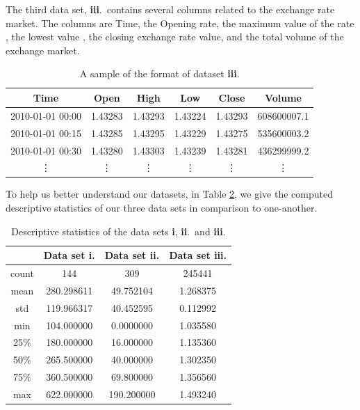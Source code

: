 \documentclass[10pt,a4paper]{article}
\begin{document}
The third data set, {\bf iii}.~contains several columns related to the exchange rate market. The columns are Time, the Opening rate, the maximum value of the rate , the lowest value , the closing exchange rate value, and the total volume of the exchange market.

\begin{table}[h]
\centering
\begin{tabular}{ c c c c c c }
            Time &     Open &    High &    Low &   Close   &  Volume \\ \hline
2010-01-01 00:00 &  1.43283 & 1.43293 & 1.43224 & 1.43293 & 608600007.1 \\
2010-01-01 00:15 &  1.43285 & 1.43295 & 1.43229 & 1.43275 & 535600003.2 \\
2010-01-01 00:30 &  1.43280 & 1.43303 & 1.43239 & 1.43281 &  436299999.2 \\
\vdots  &  \vdots  & \vdots  & \vdots  & \vdots  &  \vdots 
\end{tabular}
\caption{A sample of the format of dataset {\bf iii}.}
\label{table: sample format of dataset iii}
\end{table}
To help us better understand our datasets, in Table \ref{table: descriptive statistics of datasets}, we give the computed descriptive statistics of our three data sets in comparison to one-another.

\begin{table}[h]
\centering
\begin{tabular}{c | c | c | c}
     &    Data set {\bf i.} & Data set {\bf ii.} &  Data set {\bf iii.} \\ \hline
count &  144 & 309 & 245441  \\
mean &  280.298611 & 49.752104 & 1.268375  \\
std  &  119.966317 & 40.452595 & 0.112992  \\
min  &  104.000000 & 0.0000000 & 1.035580 \\
25$\%$  &  180.000000 & 16.000000 & 1.135360 \\
50$\%$  &  265.500000 & 40.000000 & 1.302350  \\
75$\%$  &  360.500000 & 69.800000 & 1.356560 \\
max  &  622.000000 &  190.200000 & 1.493240 
\end{tabular}
\caption{Descriptive statistics of the data sets {\bf i}, {\bf ii}.~and {\bf iii}.}
\label{table: descriptive statistics of datasets}
\end{table}

\newpage
\end{document}
